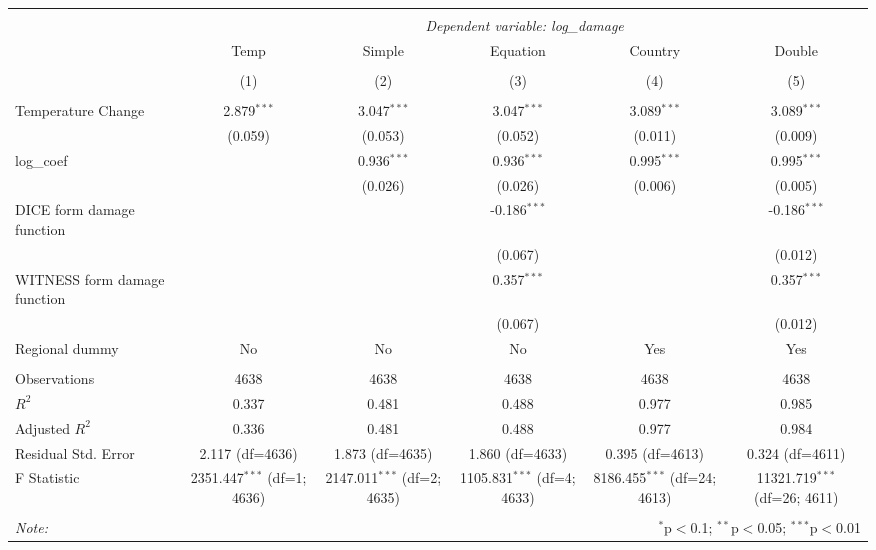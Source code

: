 \begin{table}[!htbp] \centering
\begin{tabular}{@{\extracolsep{5pt}}lccccc}
\\[-1.8ex]\hline
\hline \\[-1.8ex]
& \multicolumn{5}{c}{\textit{Dependent variable: log\_damage}} \
\cr \cline{2-6}
\\[-1.8ex] & \multicolumn{1}{c}{Temp} & \multicolumn{1}{c}{Simple} & \multicolumn{1}{c}{Equation} & \multicolumn{1}{c}{Country} & \multicolumn{1}{c}{Double}  \\
\\[-1.8ex] & (1) & (2) & (3) & (4) & (5) \\
\hline \\[-1.8ex]
 Temperature Change & 2.879$^{***}$ & 3.047$^{***}$ & 3.047$^{***}$ & 3.089$^{***}$ & 3.089$^{***}$ \\
& (0.059) & (0.053) & (0.052) & (0.011) & (0.009) \\[2em]
 log\_coef & & 0.936$^{***}$ & 0.936$^{***}$ & 0.995$^{***}$ & 0.995$^{***}$ \\
& & (0.026) & (0.026) & (0.006) & (0.005) \\[2em]
 DICE form damage function & & & -0.186$^{***}$ & & -0.186$^{***}$ \\
& & & (0.067) & & (0.012) \\[2em]
 WITNESS form damage function & & & 0.357$^{***}$ & & 0.357$^{***}$ \\
& & & (0.067) & & (0.012) \\[2em]
 Regional dummy & No & No & No & Yes & Yes \\
\hline \\[-1.8ex]
 Observations & 4638 & 4638 & 4638 & 4638 & 4638 \\
 $R^2$ & 0.337 & 0.481 & 0.488 & 0.977 & 0.985 \\
 Adjusted $R^2$ & 0.336 & 0.481 & 0.488 & 0.977 & 0.984 \\
 Residual Std. Error & 2.117 (df=4636) & 1.873 (df=4635) & 1.860 (df=4633) & 0.395 (df=4613) & 0.324 (df=4611) \\
 F Statistic & 2351.447$^{***}$ (df=1; 4636) & 2147.011$^{***}$ (df=2; 4635) & 1105.831$^{***}$ (df=4; 4633) & 8186.455$^{***}$ (df=24; 4613) & 11321.719$^{***}$ (df=26; 4611) \\
\hline
\hline \\[-1.8ex]
\textit{Note:} & \multicolumn{5}{r}{$^{*}$p$<$0.1; $^{**}$p$<$0.05; $^{***}$p$<$0.01} \\
\end{tabular}
\end{table}